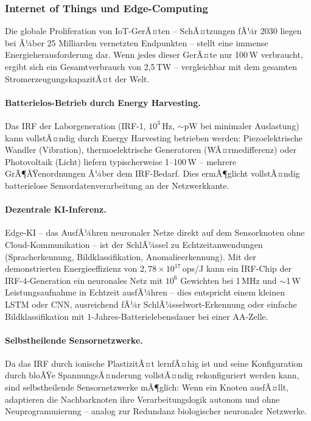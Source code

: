 ﻿\documentclass[a4paper,12pt]{scrreprt}
\theoremstyle{definition}
\begin{document}
\subsubsection{Internet of Things und Edge-Computing}
\label{subsubsec:iot}

Die globale Proliferation von IoT-GerÃ¤ten -- SchÃ¤tzungen fÃ¼r 2030 liegen
bei Ã¼ber 25 Milliarden vernetzten Endpunkten -- stellt eine immense
Energieherausforderung dar. Wenn jedes dieser GerÃ¤te nur 100\,\textmu W
verbraucht, ergibt sich ein Gesamtverbrauch von 2{,}5\,TW -- vergleichbar
mit dem gesamten StromerzeugungskapazitÃ¤t der Welt.

\paragraph{Batterielos-Betrieb durch Energy Harvesting.}
Das IRF der Laborgeneration (IRF-1, $10^3$\,Hz, $\sim$pW bei minimaler
Auslastung) kann vollstÃ¤ndig durch Energy Harvesting betrieben werden:
Piezoelektrische Wandler (Vibration), thermoelektrische Generatoren
(WÃ¤rmedifferenz) oder Photovoltaik (Licht) liefern typischerweise
1--100\,\textmu W -- mehrere GrÃ¶ÃŸenordnungen Ã¼ber dem IRF-Bedarf.
Dies ermÃ¶glicht vollstÃ¤ndig batterielose Sensordatenverarbeitung an der
Netzwerkkante.

\paragraph{Dezentrale KI-Inferenz.}
Edge-KI -- das AusfÃ¼hren neuronaler Netze direkt auf dem Sensorknoten
ohne Cloud-Kommunikation -- ist der SchlÃ¼ssel zu Echtzeitanwendungen
(Spracherkennung, Bildklassifikation, Anomalieerkennung). Mit der
demonstrierten Energieeffizienz von $2{,}78 \times 10^{17}$\,ops/J
kann ein IRF-Chip der IRF-4-Generation ein neuronales Netz mit
$10^6$ Gewichten bei 1\,MHz und $\sim$1\,\textmu W Leistungsaufnahme
in Echtzeit ausfÃ¼hren -- dies entspricht einem kleinen LSTM oder CNN,
ausreichend fÃ¼r SchlÃ¼sselwort-Erkennung oder einfache
Bildklassifikation mit 1-Jahres-Batterielebensdauer bei einer
AA-Zelle.

\paragraph{Selbstheilende Sensornetzwerke.}
Da das IRF durch ionische PlastizitÃ¤t lernfÃ¤hig ist und seine Konfiguration
durch bloÃŸe SpannungsÃ¤nderung vollstÃ¤ndig rekonfiguriert werden kann,
sind selbstheilende Sensornetzwerke mÃ¶glich: Wenn ein Knoten ausfÃ¤llt,
adaptieren die Nachbarknoten ihre Verarbeitungslogik autonom und
ohne Neuprogrammierung -- analog zur Redundanz biologischer neuronaler
Netzwerke.
\end{document}
